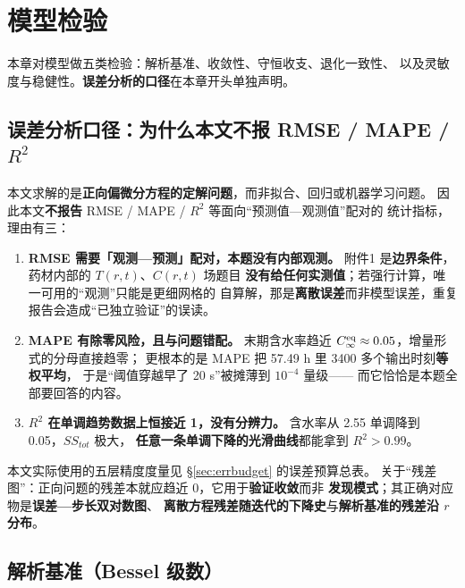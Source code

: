 \section{模型检验}

本章对模型做五类检验：解析基准、收敛性、守恒收支、退化一致性、
以及灵敏度与稳健性。\textbf{误差分析的口径}在本章开头单独声明。

\subsection{误差分析口径：为什么本文不报 RMSE / MAPE / $R^2$}

本文求解的是\textbf{正向偏微分方程的定解问题}，而非拟合、回归或机器学习问题。
因此本文\textbf{不报告} RMSE / MAPE / $R^2$ 等面向``预测值—观测值''配对的
统计指标，理由有三：

\begin{enumerate}[leftmargin=2.2em, itemsep=2pt]
  \item \textbf{RMSE 需要「观测—预测」配对，本题没有内部观测。}
        附件1 是\textbf{边界条件}，药材内部的 $T(r,t)$、$C(r,t)$ 场题目
        \textbf{没有给任何实测值}；若强行计算，唯一可用的``观测''只能是更细网格的
        自算解，那是\textbf{离散误差}而非模型误差，重复报告会造成``已独立验证''的误读。
  \item \textbf{MAPE 有除零风险，且与问题错配。}
        末期含水率趋近 $C_\infty^{\mathrm{eq}}\approx0.05$，增量形式的分母直接趋零；
        更根本的是 MAPE 把 57.49 h 里 3400 多个输出时刻\textbf{等权平均}，
        于是``阈值穿越早了 20 s''被摊薄到 $10^{-4}$ 量级——
        而它恰恰是本题全部要回答的内容。
  \item \textbf{$R^2$ 在单调趋势数据上恒接近 1，没有分辨力。}
        含水率从 2.55 单调降到 0.05，$SS_{tot}$ 极大，
        \textbf{任意一条单调下降的光滑曲线}都能拿到 $R^2>0.99$。
\end{enumerate}

本文实际使用的五层精度度量见 \S\ref{sec:errbudget} 的误差预算总表。
关于``残差图''：正向问题的残差本就应趋近 0，它用于\textbf{验证收敛}而非
\textbf{发现模式}；其正确对应物是\textbf{误差—步长双对数图}、
\textbf{离散方程残差随迭代的下降史}与\textbf{解析基准的残差沿 $r$ 分布}。

\subsection{解析基准（Bessel 级数）}

